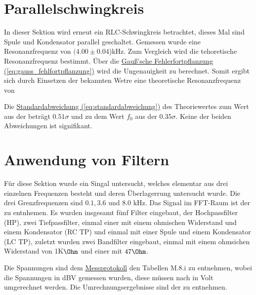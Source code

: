 \section{Parallelschwingkreis}
\label{sec:A7}
In dieser Sektion wird erneut ein RLC-Schwingkreis betrachtet, dieses Mal sind Spule und Kondensator parallel geschaltet. Gemessen wurde eine Resonanzfrequenz von $(4.00 \pm 0.04$)kHz. Zum Vergleich wird die tehoretische Resonanzfrequenz
bestimmt. Über die \hyperref[eq:gauss_fehlfortpflanzung]{Gauß'sche Fehlerfortpflanzung (\ref*{eq:gauss_fehlfortpflanzung})} wird die Ungenauigkeit zu 
berechnet. Somit ergibt sich durch Einsetzen der bekannten Wetre eine theoretische Resonanzfrequenz von

Die \hyperref[eq:standardabweichung]{Standardabweichung (\ref*{eq:standardabweichung})} des Theoriewertes zum Wert aus der  beträgt $0.51\sigma$ und zu dem Wert $f_0$ aus der  $0.35\sigma$. Keine der beiden Abweichungen ist signifikant.


\section{Anwendung von Filtern}
\label{sec:A8}
Für diese Sektion wurde ein Singal untersucht, welches elementar aus drei einzelnen Frequenzen besteht und deren Überlagerrung untersucht wurde. Die drei Grenzfrequenzen sind $0.1, 3.6 \text{ und } 8.0$ kHz.
Das Signal im FFT-Raum ist der  zu entnhemen.
Es wurden insgesamt fünf Filter eingebaut, der Hochpassfilter (HP), zwei Tiefpassfilter, einmal einer mit einem ohmischen Widerstand und einem Kondensator (RC TP) und einmal mit einer Spule und einem Kondensator (LC TP), zuletzt wurden zwei Bandfilter eingebaut, einmal mit einem ohmsichen Widerstand von 1K$\Ohm$ und einer mit $47\Ohm$.

Die Spannungen sind dem \hyperref[ch:Protokoll]{Messprotokoll} den Tabellen M.8.i zu entnehmen, wobei die Spannungen in dBV gemessen wurden, diese müssen nach  in Volt umgerechnet werden. Die Umrechnungsergebnisse sind der  zu entnehmen.

